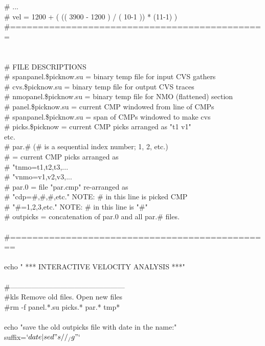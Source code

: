 \#   ... \\
\#   vel = 1200 + ( (( 3900 - 1200 ) / ( 10-1 )) * (11-1) ) \\
\#============================================== \\
 \\
 \\
\# FILE DESCRIPTIONS \\
\# spanpanel.\$picknow.su = binary temp file for input CVS gathers \\
\# cvs.\$picknow.su = binary temp file for output CVS traces \\
\# nmopanel.\$picknow.su = binary temp file for NMO (flattened) section \\
\# panel.\$picknow.su = current CMP windowed from line of CMPs \\
\# spanpanel.\$picknow.su = span of CMPs windowed to make cvs \\
\# picks.\$picknow = current CMP picks arranged as "t1 v1" \\
                                                 etc. \\
\# par.\# (\# is a sequential index number; 1, 2, etc.) \\
\#      = current CMP picks arranged as \\
\#        "tnmo=t1,t2,t3,... \\
\#        "vnmo=v1,v2,v3,... \\
\# par.0 = file "par.cmp" re-arranged as \\
\#         "cdp=\#,\#,\#,etc."  NOTE: \# in this line is picked CMP \\
\#         "\#=1,2,3,etc."    NOTE: \# in this line is "\#" \\
\# outpicks = concatenation of par.0 and all par.\# files. \\
 \\
\#=============================================== \\
 \\
echo "  *** INTERACTIVE VELOCITY ANALYSIS ***" \\
 \\
\#------------------------------------------------ \\
\#kls Remove old files.  Open new files \\
\#rm -f panel.*.su picks.* par.* tmp* \\
 \\
echo "save the old outpicks file with date in the name:" \\
suffix=$`date|sed "s/ /_/g"`$ \\
